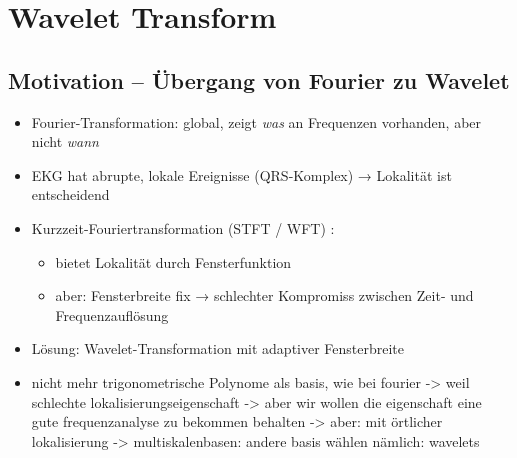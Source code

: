 \documentclass[a4paper,11pt,bibliography=totoc,listof=totoc,headinclude=true,cleardoublepage=empty,oneside]{scrbook}
\theoremstyle{definition}
\theoremstyle{remark}
\begin{document}
\chapter{Wavelet Transform}



\section{Motivation – Übergang von Fourier zu Wavelet}

  \begin{itemize}
    \item Fourier-Transformation: global, zeigt \emph{was} an Frequenzen vorhanden,
      aber nicht \emph{wann} \cite[S.\,8, 9]{blatterWaveletsEinfuhrung2003}
    \item EKG hat abrupte, lokale Ereignisse (QRS-Komplex) → Lokalität ist entscheidend
      \cite[S.\,25, 34]{gacekIntroductionECGSignal2012}
    \item Kurzzeit-Fouriertransformation (STFT / WFT)
      \cite[S.\,10--12]{blatterWaveletsEinfuhrung2003}:
      \begin{itemize}
        \item bietet Lokalität durch Fensterfunktion
        \item aber: Fensterbreite fix → schlechter Kompromiss zwischen Zeit- und Frequenzauflösung
      \end{itemize}
    \item Lösung: Wavelet-Transformation mit adaptiver Fensterbreite
      \cite[p.\,vii]{daubechiesTenLecturesWavelets2006}
    \item nicht mehr trigonometrische Polynome als basis, wie bei fourier 
    -> weil schlechte lokalisierungseigenschaft 
    -> aber wir wollen die eigenschaft eine gute frequenzanalyse zu bekommen behalten 
    -> aber: mit örtlicher lokalisierung
    -> multiskalenbasen: andere basis wählen nämlich: wavelets  
  \end{itemize}
\end{document}
